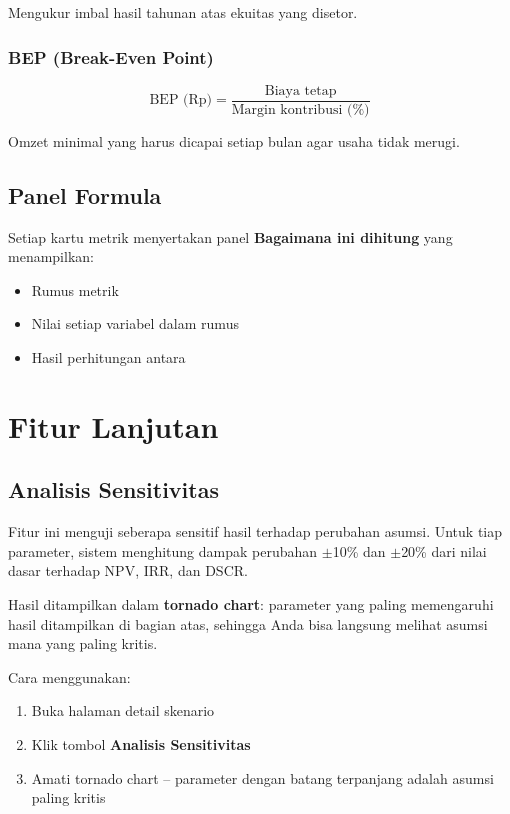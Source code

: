 \documentclass[12pt,a4paper,twoside]{report}
\begin{document}
Mengukur imbal hasil tahunan atas ekuitas yang disetor.

\subsection{BEP (Break-Even Point)}

\[
\text{BEP (Rp)} = \frac{\text{Biaya tetap}}{\text{Margin kontribusi (\%)}}
\]

Omzet minimal yang harus dicapai setiap bulan agar usaha tidak merugi.

\section{Panel Formula}

Setiap kartu metrik menyertakan panel \textbf{Bagaimana ini dihitung} yang menampilkan:
\begin{itemize}
  \item Rumus metrik
  \item Nilai setiap variabel dalam rumus
  \item Hasil perhitungan antara
\end{itemize}

\chapter{Fitur Lanjutan}

\section{Analisis Sensitivitas}

Fitur ini menguji seberapa sensitif hasil terhadap perubahan asumsi. Untuk tiap parameter, sistem menghitung dampak perubahan $\pm$10\% dan $\pm$20\% dari nilai dasar terhadap NPV, IRR, dan DSCR.

Hasil ditampilkan dalam \textbf{tornado chart}: parameter yang paling memengaruhi hasil ditampilkan di bagian atas, sehingga Anda bisa langsung melihat asumsi mana yang paling kritis.

Cara menggunakan:
\begin{enumerate}
  \item Buka halaman detail skenario
  \item Klik tombol \textbf{Analisis Sensitivitas}
  \item Amati tornado chart -- parameter dengan batang terpanjang adalah asumsi paling kritis
\end{enumerate}
\end{document}

